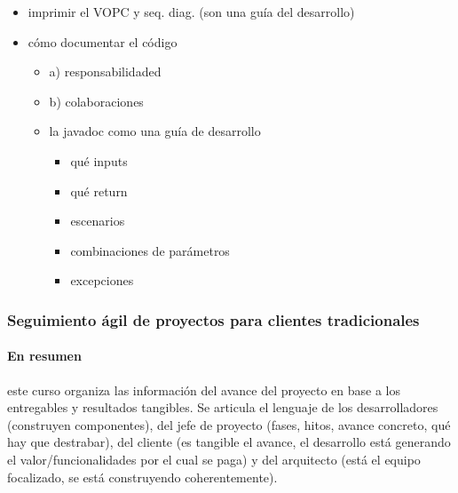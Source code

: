 \documentclass[11pt]{article}
\begin{document}
\begin{itemize}
\begin{itemize}
\item     vopc
          \begin{itemize}
\item         siguiendo un escenario
\item         para saber qu\'e hay que hacer
\item         verificar que cierra (correcto) \ldots no siempre necesario, depende del nivel de detalle
          \end{itemize}
\item     asignar packages
\item     asignar componentes
\item     (a veces) interacciones complejas
\item     actualizar decisiones de dise\~no
\item     solo ocupar lo que responde la inquietud a la mano
      \end{itemize}
\item imprimir el VOPC y seq. diag. (son una gu\'ia del desarrollo)
\item c\'omo documentar el c\'odigo
      \begin{itemize}
\item     a) responsabilidaded
\item     b) colaboraciones
\item     la javadoc como una gu\'ia de desarrollo
          \begin{itemize}
\item         qu\'e inputs
\item         qu\'e return
\item         escenarios
\item             combinaciones de par\'ametros
\item         excepciones
          \end{itemize}
      \end{itemize}
\end{itemize}



\subsubsection*{Seguimiento \'agil de proyectos para clientes tradicionales}
\paragraph{En resumen} este curso organiza las informaci\'on del avance del proyecto en base a los entregables y resultados tangibles.  Se articula el lenguaje de los desarrolladores (construyen componentes), del jefe de proyecto (fases, hitos, avance concreto, qu\'e hay que destrabar), del cliente (es tangible el avance, el desarrollo est\'a generando el valor/funcionalidades por el cual se paga) y del arquitecto (est\'a el equipo focalizado, se est\'a construyendo coherentemente).
\end{document}
